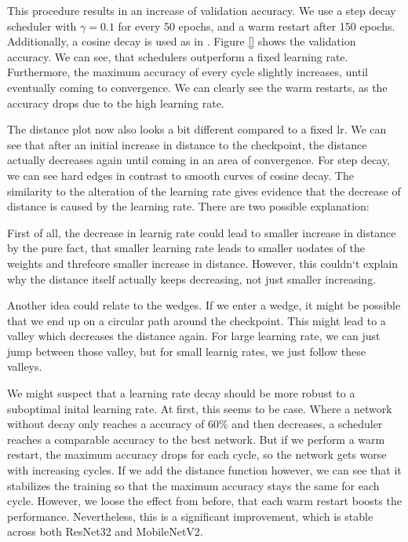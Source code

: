 This procedure results in an increase of validation accuracy. We use a step
decay scheduler with $\gamma = 0.1$ for every 50 epochs, and a warm restart
after 150 epochs. Additionally, a cosine decay is used as in
\cite{loshchilov2016sgdr}. Figure \ref{} shows the validation accuracy. We can
see, that schedulers outperform a fixed learning rate. Furthermore, the maximum
accuracy of every cycle slightly increases, until eventually coming to
convergence. We can clearly see the warm restarts, as the accuracy drops due to
the high learning rate.

The distance plot now also looks a bit different compared to a fixed lr. We can
see that after an initial increase in distance to the checkpoint, the distance
actually decreases again until coming in an area of convergence. For step decay,
we can see hard edges in contrast to smooth curves of cosine decay. The
similarity to the alteration of the learning rate gives evidence that the
decrease of distance is caused by the learning rate. There are two possible explanation: 

First of all, the decrease in learnig rate could lead to smaller increase in
distance by the pure fact, that smaller learning rate leads to smaller uodates
of the weights and threfeore smaller increase in distance. However, this
couldn`t explain why the distance itself actually keeps decreasing, not just
smaller increasing.

Another idea could relate to the wedges. If we enter a wedge, it might be
possible that we end up on a circular path around the checkpoint. This might
lead to a valley which decreases the distance again. For large learning rate, we
can just jump between those valley, but for small learnig rates, we just follow
these valleys.



We might suspect that a learning rate decay should be more robust to a
suboptimal inital learning rate. At first, this seems to be case. Where a
network without decay only reaches a accuracy of 60\% and then decreases, a
scheduler reaches a comparable accuracy to the best network. But if we perform a
warm restart, the maximum accuracy drops for each cycle, so the network gets
worse with increasing cycles. If we add the distance function however, we can
see that it stabilizes the training so that the maximum accuracy stays the same
for each cycle. However, we loose the effect from before, that each warm restart
boosts the performance. Nevertheless, this is a significant improvement, which
is stable across both ResNet32 and MobileNetV2.

